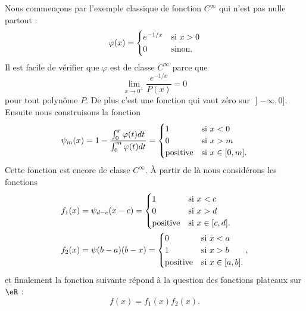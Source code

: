 Nous commençons par l'exemple classique de fonction \(  C^{\infty}\) qui n'est pas nulle partout :
\begin{equation}
    \varphi(x)=\begin{cases}
        e^{-1/x}    &   \text{si \( x>0\)}\\
        0    &    \text{sinon}.
    \end{cases}
\end{equation}
Il est facile de vérifier que \( \varphi\) est de classe \(  C^{\infty}\) parce que
\begin{equation}
    \lim_{x\to 0^+} \frac{  e^{-1/x} }{ P(x) }=0 
\end{equation}
pour tout polynôme \( P\). De plus c'est une fonction qui vaut zéro sur \( \mathopen] -\infty , 0 \mathclose]\). Ensuite nous construisons la fonction
\begin{equation}
    \psi_m(x)=1-\frac{ \int_0^x \varphi(t)dt }{ \int_0^m\varphi(t)dt}=\begin{cases}
        1    &   \text{si \( x<0\)}\\
        0    &    \text{si \( x>m\)}\\
        \text{positive} &\text{si \( x\in\mathopen[ 0 , m \mathclose]\)}.
    \end{cases}
\end{equation}
Cette fonction est encore de classe $ C^{\infty}$. À partir de là nous considérons les fonctions
\begin{subequations}
    \begin{align}
        f_1(x)&=\psi_{d-c}(x-c)=\begin{cases}
            1    &   \text{si \( x<c\)}\\
            0    &    \text{si \( x>d\)}\\
            \text{positive} &\text{si \( x\in\mathopen[ c , d \mathclose]\)}.
        \end{cases}\\
        f_2(x)&=\psi(b-a)(b-x)=\begin{cases}
            0    &   \text{si \( x<a\)}\\
            1    &    \text{si \( x>b\)}\\
            \text{positive} &\text{si \( x\in \mathopen[ a , b \mathclose]\)}.
        \end{cases},
    \end{align}
\end{subequations}
et finalement la fonction suivante répond à la question des fonctions plateaux sur \( \eR\) :
\begin{equation}
    f(x)=f_1(x)f_2(x).
\end{equation}


